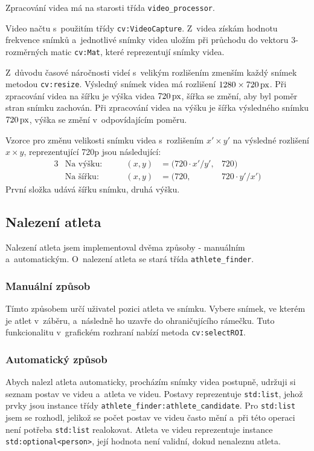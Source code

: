 Zpracování videa má na starosti třída \texttt{video\_processor}. 

Video načtu s~použitím třídy \texttt{cv\::VideoCapture}. Z~videa získám hodnotu frekvence snímků a~jednotlivé snímky videa uložím při průchodu do vektoru $3$-rozměrných matic \texttt{cv\::Mat}, které reprezentují snímky videa.

Z~důvodu časové náročnosti videí s~velikým rozlišením zmenším každý snímek metodou \texttt{cv\::resize}. Výsledný snímek videa má rozlišení $1280\times 720\,\rm px$. Při zpracování videa na šířku je výška videa $720\,\rm px$, šířka se změní, aby byl poměr stran snímku zachován. Při zpracování videa na výšku je šířka výsledného snímku $720\,\rm px$, výška se změní v~odpovídajícím poměru.

Vzorce pro změnu velikosti snímku videa s~rozlišením $x'\times y'$ na výsledné rozlišení $x\times y$, reprezentující 720p jsou následující:
\begin{alignat*}{3}
    &\text{Na výšku:}   &\qquad (x, y) &= (720 \cdot x' / y',   &720) \\
    &\text{Na šířku:}   &\qquad (x, y) &= (720,                 &720 \cdot y' / x')
\end{alignat*}
První složka udává šířku snímku, druhá výšku.



\subsection{Nalezení atleta}

Nalezení atleta jsem implementoval dvěma způsoby - manuálním a~automatickým. O~nalezení atleta se stará třída \texttt{athlete\_finder}.

\subsubsection{Manuální způsob}

Tímto způsobem určí uživatel pozici atleta ve snímku. Vybere snímek, ve kterém je atlet v~záběru, a~následně ho uzavře do ohraničujícího rámečku. Tuto funkcionalitu v~grafickém rozhraní nabízí metoda \texttt{cv\::selectROI}.


\subsubsection{Automatický způsob}

Abych nalezl atleta automaticky, procházím snímky videa postupně, udržuji si seznam postav ve videu a~atleta ve videu. Postavy reprezentuje \texttt{std\::list}, jehož prvky jsou instance třídy \texttt{athlete\_finder\::athlete\_candidate}. Pro \texttt{std\::list} jsem se rozhodl, jelikož se počet postav ve videu často mění a~při této operaci není potřeba \texttt{std\::list} realokovat. Atleta ve videu reprezentuje instance \texttt{std\::optional<person>}, její hodnota není validní, dokud nenaleznu atleta.

